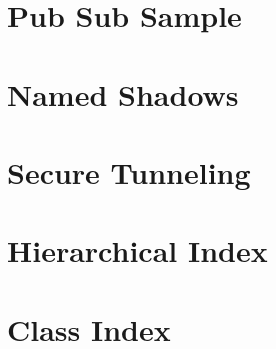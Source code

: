 \let\mypdfximage\pdfximage\def\pdfximage{\immediate\mypdfximage}\documentclass[twoside]{book}
\newcommand{\+}{\discretionary{\mbox{\scriptsize$\hookleftarrow$}}{}{}}
\begin{document}
\chapter{Pub Sub Sample}
\label{md__home_runner_work_aws-iot-device-client_aws-iot-device-client_source_samples_pubsub__r_e_a_d_m_e}

\chapter{Named Shadows}
\label{md__home_runner_work_aws-iot-device-client_aws-iot-device-client_source_shadow__r_e_a_d_m_e}

\chapter{Secure Tunneling}
\label{md__home_runner_work_aws-iot-device-client_aws-iot-device-client_source_tunneling__r_e_a_d_m_e}

\chapter{Hierarchical Index}

\chapter{Class Index}

\end{document}
